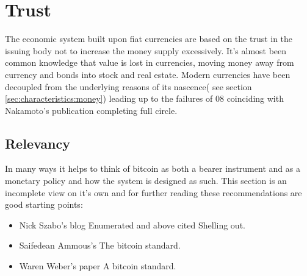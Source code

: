 \section{Trust}

The economic system built upon fiat currencies are based on the trust in the issuing body not to increase the money supply excessively. It's almost been common knowledge that value is lost in currencies, moving money away from currency and bonds into stock and real estate. Modern currencies have been decoupled from the underlying reasons of its nascence( see section \ref{sec:characteristics:money}) leading up to the failures of 08 coinciding with Nakamoto's publication completing full circle.

\newpage
\noindent
\vspace{6cm}

\subsection{Relevancy}
In many ways it helps to think of bitcoin as both a bearer instrument and as a monetary policy and how the system is designed as such. This section is an incomplete view on it's own and for further reading these recommendations are good starting points: 

\begin{itemize}
	\item Nick Szabo's blog Enumerated and above cited Shelling out\cite{szabo:shelling:out}.
	\item Saifedean Ammous's The bitcoin standard.\cite{ammous:bitcoin:standard}
	\item Waren Weber's paper A bitcoin standard.\cite{weber:bitcoin:standard}
\end{itemize}